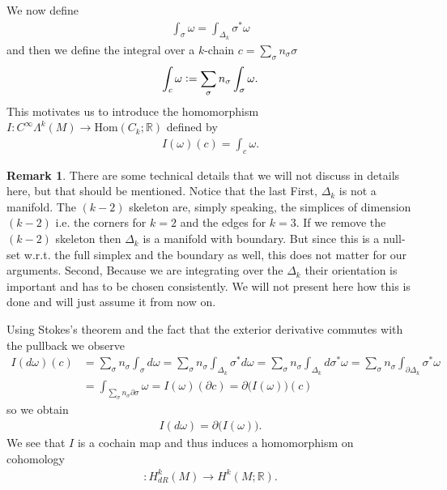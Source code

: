 \documentclass[12pt,a4paper]{article}
\numberwithin{equation}{subsection}
\numberwithin{lemma}{subsection}
\theoremstyle{definition}
\newtheorem{remark}[lemma]{Remark}
\newcommand{\real}{\mathbb{R}}
\begin{document}
We now define 
\begin{align*}
    \int_\sigma \omega = \int_{\Delta_k} \sigma^* \omega
\end{align*}
and then we define the integral over a $k$-chain 
$c = \sum_\sigma n_\sigma \sigma$
\begin{align*}
    \int_c \omega \vcentcolon= \sum \limits_\sigma n_\sigma \int_\sigma \omega.
\end{align*}
This motivates us to introduce the homomorphism $I: C^\infty \Lambda^k (M) 
\rightarrow \text{Hom}(C_k;\real)$ defined by 
\begin{align*}
    I(\omega)(c) = \int_c \omega.
\end{align*}
\begin{remark}
    There are some technical details that we will not discuss in details here,
    but that should be mentioned. Notice that the last First, $\Delta_k$ is not a manifold. 
    The $(k-2)$ skeleton are, simply speaking, 
    the simplices of dimension $(k-2)$ i.e. the corners for $k=2$ and the 
    edges for $k=3$. If we remove the $(k-2)$ skeleton 
    then $\Delta_k$ is a manifold 
    with boundary. But since this is a null-set w.r.t. the full simplex and 
    the boundary as well, this does not matter for our arguments. 
    Second, Because we are integrating over the $\Delta_k$ their orientation is 
    important and has to be chosen consistently. We will not present here 
    how this is done and will just assume it from now on.
\end{remark}

Using Stokes's theorem and the fact that the exterior derivative commutes with 
the pullback we observe
\begin{align*}
    I(d\omega)(c) &= \sum\limits_\sigma n_\sigma \int_\sigma d\omega 
    = \sum\limits_\sigma n_\sigma \int_{\Delta_k} \sigma^* d\omega 
    = \sum\limits_\sigma n_\sigma \int_{\Delta_k} d\sigma^* \omega
    = \sum\limits_\sigma n_\sigma \int_{\partial \Delta_k} \sigma^* \omega
    \\ &= \int_{\sum_\sigma n_\sigma \partial \sigma} \omega
    = I(\omega)(\partial c) = \partial \big(I(\omega)\big) (c)
\end{align*}
so we obtain
\begin{align*}
    I(d\omega) = \partial \big(I(\omega)\big).
\end{align*}
We see that $I$ is a cochain map and thus 
induces a homomorphism on cohomology
\begin{align*}
    [I]:H^k_{dR}(M) \rightarrow H^k(M;\real).
\end{align*}
\end{document}
